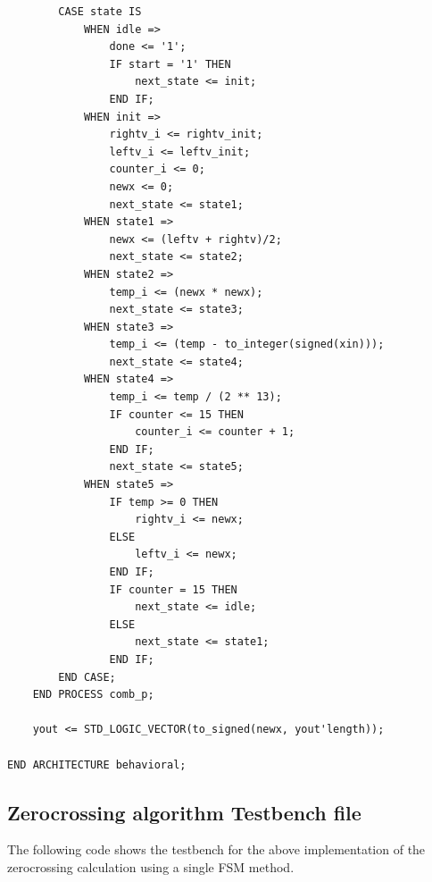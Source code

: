 \documentclass[11pt, a4paper]{report}
\begin{document}
\begin{verbatim}
        CASE state IS
            WHEN idle =>
                done <= '1';
                IF start = '1' THEN
                    next_state <= init;
                END IF;
            WHEN init =>
                rightv_i <= rightv_init;
                leftv_i <= leftv_init;
                counter_i <= 0;
                newx <= 0;
                next_state <= state1;
            WHEN state1 =>
                newx <= (leftv + rightv)/2;
                next_state <= state2;
            WHEN state2 =>
                temp_i <= (newx * newx);
                next_state <= state3;
            WHEN state3 =>
                temp_i <= (temp - to_integer(signed(xin)));
                next_state <= state4;
            WHEN state4 =>
                temp_i <= temp / (2 ** 13);
                IF counter <= 15 THEN
                    counter_i <= counter + 1;
                END IF;
                next_state <= state5;
            WHEN state5 =>
                IF temp >= 0 THEN
                    rightv_i <= newx;
                ELSE
                    leftv_i <= newx;
                END IF;
                IF counter = 15 THEN
                    next_state <= idle;
                ELSE
                    next_state <= state1;
                END IF;
        END CASE;
    END PROCESS comb_p;

    yout <= STD_LOGIC_VECTOR(to_signed(newx, yout'length));

END ARCHITECTURE behavioral;
\end{verbatim}

\subsection{Zerocrossing algorithm Testbench file}
The following code shows the testbench for the above implementation of the zerocrossing calculation using a single FSM method.
\end{document}
